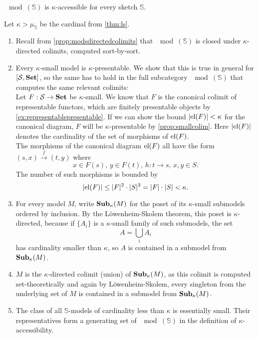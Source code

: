 \begin{Theorem}
$\mod(\mathbb S)$ is $\kappa$-accessible for every sketch $\mathbb S$.
\end{Theorem}
\begin{Proof}
Let $\kappa > \mu_\mathbb S$ be the cardinal from \ref{thm:ls}.
\begin{enumerate}
\item Recall from \ref{prop:modsdirectedcolimits} that $\mod(\mathbb S)$ is closed under $\kappa$-directed colimits, computed sort-by-sort.
\item Every $\kappa$-small model is $\kappa$-presentable. We show that this is true in general for $[\mathcal{S},\mathbf{Set}]$, so the same has to hold in the full subcategory $\mod(\mathbb S)$ that computes the same relevant colimits: \\

Let $F : \mathcal{S} \to \mathbf{Set}$ be $\kappa$-small. We know that $F$ is the canonical colimit of representable functors, which are finitely presentable objects by \ref{ex:representablepresentable}. If we can show the bound $|\textrm{el}(F)| < \kappa$ for the canonical diagram, $F$ will be $\kappa$-presentable by \ref{prop:smallcolim}. Here $|\textrm{el}(F)|$ denotes the cardinality of the set of morphisms of $\textrm{el}(F)$. \\

The morphisms of the canonical diagram $\textrm{el}(F)$ all have the form $(s,x) \xrightarrow{f} (t,y)$ where
\[ x \in F(s),\, y \in F(t),\, h : t \to s,\, x, y \in S. \]
The number of such morphisms is bounded by
\[ |\textrm{el}(F)| \leq |F|^2 \cdot |S|^3 = |F|\cdot |S| < \kappa. \]

\item For every model $M$, write $\mathbf{Sub}_\kappa(M)$ for the poset of its $\kappa$-small submodels ordered by inclusion. By the Löwenheim-Skolem theorem, this poset is $\kappa$-directed, because if $\{A_i\}$ is a $\kappa$-small family of such submodels, the set
\[ A = \bigcup_i A_i \]
has cardinality smaller than $\kappa$, so $A$ is contained in a submodel from $\mathbf{Sub}_\kappa(M)$.

\item $M$ is the $\kappa$-directed colimit (union) of $\mathbf{Sub}_\kappa(M)$, as this colimit is computed set-theoretically and again by Löwenheim-Skolem, every singleton from the underlying set of $M$ is contained in a submodel from $\mathbf{Sub}_\kappa(M)$. 

\item The class of all $\mathbb S$-models of cardinality less than $\kappa$ is essentially small. Their representatives form a generating set of $\mod(\mathbb S)$ in the definition of $\kappa$-accessibility.
\end{enumerate}
\end{Proof}


